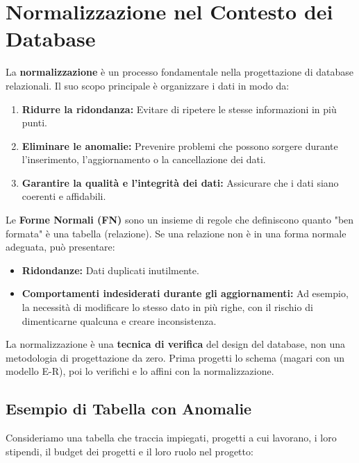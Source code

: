 \section{Normalizzazione nel Contesto dei Database}

La \textbf{normalizzazione} è un processo fondamentale nella progettazione di database relazionali. Il suo scopo principale è organizzare i dati in modo da:
\begin{enumerate}
	\item \textbf{Ridurre la ridondanza:} Evitare di ripetere le stesse informazioni in più punti.
	\item \textbf{Eliminare le anomalie:} Prevenire problemi che possono sorgere durante l'inserimento, l'aggiornamento o la cancellazione dei dati.
	\item \textbf{Garantire la qualità e l'integrità dei dati:} Assicurare che i dati siano coerenti e affidabili.
\end{enumerate}

Le \textbf{Forme Normali (FN)} sono un insieme di regole che definiscono quanto "ben formata" è una tabella (relazione). Se una relazione non è in una forma normale adeguata, può presentare:
\begin{itemize}
	\item \textbf{Ridondanze:} Dati duplicati inutilmente.
	\item \textbf{Comportamenti indesiderati durante gli aggiornamenti:} Ad esempio, la necessità di modificare lo stesso dato in più righe, con il rischio di dimenticarne qualcuna e creare inconsistenza.
\end{itemize}

La normalizzazione è una \textbf{tecnica di verifica} del design del database, non una metodologia di progettazione da zero. Prima progetti lo schema (magari con un modello E-R), poi lo verifichi e lo affini con la normalizzazione.

\subsection{Esempio di Tabella con Anomalie}
Consideriamo una tabella che traccia impiegati, progetti a cui lavorano, i loro stipendi, il budget dei progetti e il loro ruolo nel progetto:

